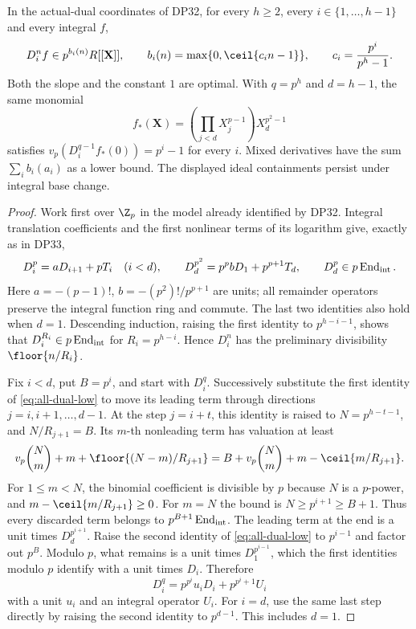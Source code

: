 \begin{theorem}\label{DP34}
In the actual-dual coordinates of DP32, for every $h\ge2$, every $i\in\{1,\ldots,h-1\}$ and every integral $f$,
\[
 D_i^nf\in p^{b_i(n)}R[[\mathbf X]],\qquad
 b_i(n)=\max\{0,\ceil{c_i n-1}\},\qquad c_i=\frac{p^i}{p^h-1}.
\]
Both the slope and the constant $1$ are optimal. With $q=p^h$ and $d=h-1$, the same monomial
\[
 f_*(\mathbf X)=\left(\prod_{j<d}X_j^{p-1}\right)X_d^{p^2-1}
\]
satisfies $v_p(D_i^{q-1}f_*(0))=p^i-1$ for every $i$. Mixed derivatives have the sum $\sum_i b_i(a_i)$ as a lower bound. The displayed ideal containments persist under integral base change.
\end{theorem}
\begin{proof}
Work first over $\Z_p$ in the model already identified by DP32. Integral translation coefficients and the first nonlinear terms of its logarithm give, exactly as in DP33,
\begin{equation}\label{eq:all-dual-low}
 D_i^p=aD_{i+1}+pT_i\quad(i<d),\qquad
 D_d^{p^2}=p^pbD_1+p^{p+1}T_d,\qquad D_d^p\in p\operatorname{End}_{\rm int}.
\end{equation}
Here $a=-(p-1)!$, $b=-(p^2)!/p^{p+1}$ are units; all remainder operators preserve the integral function ring and commute. The last two identities also hold when $d=1$. Descending induction, raising the first identity to $p^{h-i-1}$, shows that $D_i^{R_i}\in p\operatorname{End}_{\rm int}$ for $R_i=p^{h-i}$. Hence $D_i^n$ has the preliminary divisibility $\floor{n/R_i}$.

Fix $i<d$, put $B=p^i$, and start with $D_i^q$. Successively substitute the first identity of \eqref{eq:all-dual-low} to move its leading term through directions $j=i,i+1,\ldots,d-1$. At the step $j=i+t$, this identity is raised to $N=p^{h-t-1}$, and $N/R_{j+1}=B$. Its $m$-th nonleading term has valuation at least
\[
 v_p\binom Nm+m+\floor{(N-m)/R_{j+1}}
 =B+v_p\binom Nm+m-\ceil{m/R_{j+1}}.
\]
For $1\le m<N$, the binomial coefficient is divisible by $p$ because $N$ is a $p$-power, and $m-\ceil{m/R_{j+1}}\ge0$. For $m=N$ the bound is $N\ge p^{i+1}\ge B+1$. Thus every discarded term belongs to $p^{B+1}\operatorname{End}_{\rm int}$. The leading term at the end is a unit times $D_d^{p^{i+1}}$. Raise the second identity of \eqref{eq:all-dual-low} to $p^{i-1}$ and factor out $p^B$. Modulo $p$, what remains is a unit times $D_1^{p^{i-1}}$, which the first identities modulo $p$ identify with a unit times $D_i$. Therefore
\begin{equation}\label{eq:all-dual-q}
 D_i^q=p^{p^i}u_iD_i+p^{p^i+1}U_i
\end{equation}
with a unit $u_i$ and an integral operator $U_i$. For $i=d$, use the same last step directly by raising the second identity to $p^{d-1}$. This includes $d=1$.


\end{proof}
